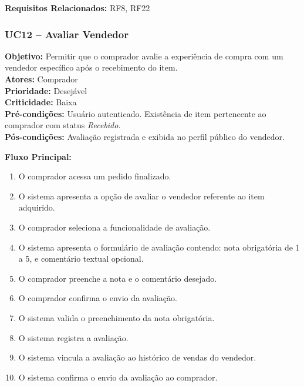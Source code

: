 \documentclass[
	article,			%
	11pt,				%
	oneside,			%
	a4paper,			%
	english,			%
	brazil,				%
	sumario=tradicional
	]{abntex2}
\begin{document}
\vspace{0.5em}
\noindent\textbf{Requisitos Relacionados:} RF8, RF22


\subsubsection{UC12 – Avaliar Vendedor}
\label{uc:12}
\noindent\textbf{Objetivo:} Permitir que o comprador avalie a experiência de compra com um vendedor específico após o recebimento do item.\\
\textbf{Atores:} Comprador\\
\textbf{Prioridade:} Desejável\\
\textbf{Criticidade:} Baixa\\
\textbf{Pré-condições:} Usuário autenticado. Existência de item pertencente ao comprador com status \textit{Recebido}.\\
\textbf{Pós-condições:} Avaliação registrada e exibida no perfil público do vendedor.

\vspace{0.5em}
\noindent\textbf{Fluxo Principal:}
\begin{enumerate}[label=\arabic*.]
    \item O comprador acessa um pedido finalizado.
    \item O sistema apresenta a opção de avaliar o vendedor referente ao item adquirido.
    \item O comprador seleciona a funcionalidade de avaliação.
    \item O sistema apresenta o formulário de avaliação contendo: nota obrigatória de 1 a 5, e comentário textual opcional.
    \item O comprador preenche a nota e o comentário desejado.
    \item O comprador confirma o envio da avaliação.
    \item O sistema valida o preenchimento da nota obrigatória.
    \item O sistema registra a avaliação.
    \item O sistema vincula a avaliação ao histórico de vendas do vendedor.
    \item O sistema confirma o envio da avaliação ao comprador.
\end{enumerate}
\end{document}
